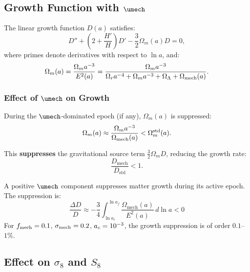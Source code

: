 \subsection{Growth Function with $\umech$}
\label{sec:growth_function}

The linear growth function $D(a)$ satisfies:
\begin{equation}
\label{eq:growth_ODE}
D'' + \left(2 + \frac{H'}{H}\right)D' - \frac{3}{2}\Omega_m(a) D = 0,
\end{equation}
where primes denote derivatives with respect to $\ln a$, and:
\begin{equation}
\Omega_m(a) = \frac{\Omega_m a^{-3}}{E^2(a)} = \frac{\Omega_m a^{-3}}{\Omega_r a^{-4} + \Omega_m a^{-3} + \Omega_\Lambda + \Omega_{\mathrm{mech}}(a)}.
\end{equation}

\subsubsection{Effect of $\umech$ on Growth}

During the $\umech$-dominated epoch (if any), $\Omega_m(a)$ is suppressed:
\begin{equation}
\Omega_m(a) \approx \frac{\Omega_m a^{-3}}{\Omega_{\mathrm{mech}}(a)} < \Omega_m^{\mathrm{std}}(a).
\end{equation}

This \textbf{suppresses} the gravitational source term $\frac{3}{2}\Omega_m D$, reducing the growth rate:
\begin{equation}
\frac{D_{\mathrm{mech}}}{D_{\mathrm{std}}} < 1.
\end{equation}

\begin{proposition}
\label{prop:growth_suppression}
A positive $\umech$ component suppresses matter growth during its active epoch. The suppression is:
\begin{equation}
\boxed{\frac{\Delta D}{D} \approx -\frac{3}{4}\int_{\ln a_i}^{\ln a_f} \frac{\Omega_{\mathrm{mech}}(a)}{E^2(a)} \, d\ln a < 0}
\end{equation}
For $f_{\mathrm{mech}} = 0.1$, $\sigma_{\mathrm{mech}} = 0.2$, $a_c = 10^{-3}$, the growth suppression is of order $0.1$--$1\%$.
\end{proposition}

\subsection{Effect on $\sigma_8$ and $S_8$}
\label{sec:sigma8}

